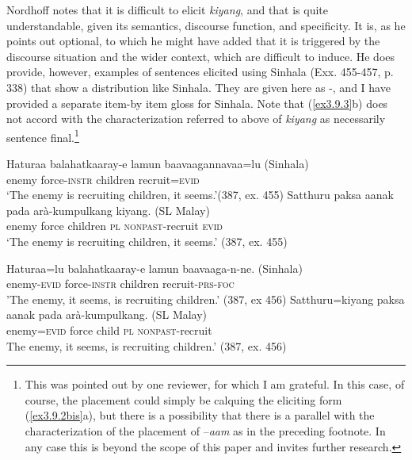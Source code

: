 Nordhoff notes that it is difficult to elicit \textit{kiyang}, and that is quite understandable, given its semantics, discourse function, and specificity. It is, as he points out optional, to which he might have added that it is triggered by the discourse situation and the wider context, which are difficult to induce. He does provide, however, examples of sentences elicited using Sinhala (Exx. 455-457, p. 338) that show a distribution like Sinhala. They are given here as -, and I have provided a separate item-by item gloss for Sinhala. Note that (\ref{ex3.9.3}b) does not accord with the characterization referred to above of \textit{kiyang} as necessarily sentence final.\footnote{This
  was pointed out by one reviewer, for which I am grateful. In this case, of course, the placement could simply be calquing the eliciting form (\ref{ex3.9.2bis}a), but there is a possibility that there is a parallel with the characterization of the placement of --\textit{aam} as in the preceding footnote. In any case this is beyond the scope of this paper and invites further research.
}



\ea\label{ex3.9.2bis} 
\ea
\gll Haturaa balahatkaaray-e{\ng} lamun ba{\und}avaagannavaa=lu  (Sinhala)\\
  enemy force-\textsc{instr}     children recruit=\textsc{evid} \\
  `The enemy is recruiting children, it seems.'\footnotemark (387, ex. 455)
\ex
\gll Satthuru paksa aanak pada arà-kumpulkang kiyang.  (SL Malay)\\
  enemy   force children \textsc{pl} \textsc{nonpast}-recruit \textsc{evid}\\
  `The enemy is recruiting children, it seems.' (387, ex. 455)
\z
\z
{}



\ea\label{ex3.9.3} 
\ea
\gll Haturaa=lu balahatkaaray-e{\ng} lamun ba{\und}avaaga-n-ne. (Sinhala)\\
  enemy-\textsc{evid} force-\textsc{instr} children recruit-\textsc{prs}-\textsc{foc} \\
'The enemy, it seems, is recruiting children.' (387, ex 456)
\ex
\gll Satthuru=kiyang paksa aanak pada arà-kumpulkang. (SL Malay)\\
  enemy=\textsc{evid} force child \textsc{pl} \textsc{nonpast}-recruit  \\
   The enemy, it seems, is recruiting children.' (387, ex. 456)
\z
\z

